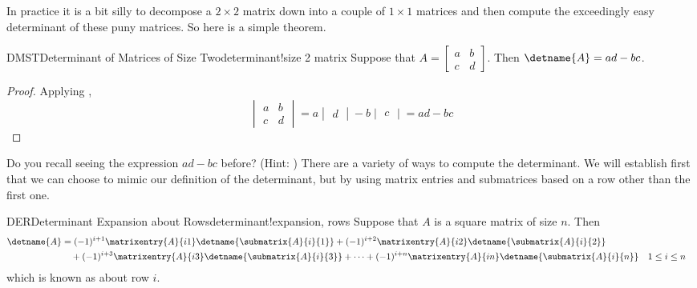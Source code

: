 In practice it is a bit silly to decompose a $2\times 2$ matrix down into a couple of $1\times 1$ matrices and then compute the exceedingly easy determinant of these puny matrices.  So here is a simple theorem.
%
\begin{theorem}{DMST}{Determinant of Matrices of Size Two}{determinant!size 2 matrix}
Suppose that $A=\begin{bmatrix}a&b\\c&d\end{bmatrix}$.  Then $\detname{A}=ad-bc$.
\end{theorem}
%
\begin{proof}
Applying ,
%
\begin{equation*}
\begin{vmatrix}
a&b\\c&d
\end{vmatrix}=
a\begin{vmatrix}d\end{vmatrix}-b\begin{vmatrix}c\end{vmatrix}=ad-bc
\end{equation*}
%
\end{proof}
%
Do you recall seeing the expression $ad-bc$ before?  (Hint:  )
%
%
There are a variety of ways to compute the determinant.  We will establish first that we can choose to mimic our definition of the determinant, but by using matrix entries and submatrices based on a row other than the first one.
%
\begin{theorem}{DER}{Determinant Expansion about Rows}{determinant!expansion, rows}
Suppose that $A$ is a square matrix of size $n$.  Then
%
\begin{align*}
\detname{A}&=
(-1)^{i+1}\matrixentry{A}{i1}\detname{\submatrix{A}{i}{1}}+
(-1)^{i+2}\matrixentry{A}{i2}\detname{\submatrix{A}{i}{2}}\\
&\quad+(-1)^{i+3}\matrixentry{A}{i3}\detname{\submatrix{A}{i}{3}}+
\cdots+
(-1)^{i+n}\matrixentry{A}{in}\detname{\submatrix{A}{i}{n}}
&&
1\leq i\leq n
%
\end{align*}
%
which is known as  about row $i$.
%
\end{theorem}
%

